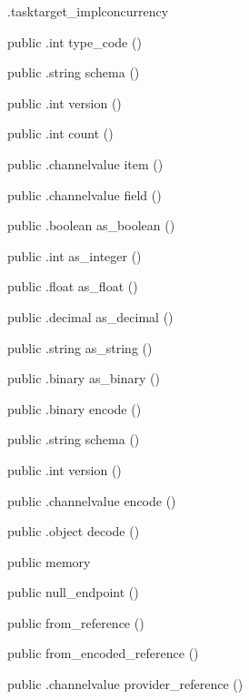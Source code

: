 \begin{CrexxClass}{.tasktarget\_impl}{concurrency}
\begin{Members}
    \Method
      {public}
      {.int}
      {type\_code}
      {()}

    \Method
      {public}
      {.string}
      {schema}
      {()}

    \Method
      {public}
      {.int}
      {version}
      {()}

    \Method
      {public}
      {.int}
      {count}
      {()}

    \Method
      {public}
      {.channelvalue}
      {item}
      {()}

    \Method
      {public}
      {.channelvalue}
      {field}
      {()}

    \Method
      {public}
      {.boolean}
      {as\_boolean}
      {()}

    \Method
      {public}
      {.int}
      {as\_integer}
      {()}

    \Method
      {public}
      {.float}
      {as\_float}
      {()}

    \Method
      {public}
      {.decimal}
      {as\_decimal}
      {()}

    \Method
      {public}
      {.string}
      {as\_string}
      {()}

    \Method
      {public}
      {.binary}
      {as\_binary}
      {()}

    \Method
      {public}
      {.binary}
      {encode}
      {()}

    \Method
      {public}
      {.string}
      {schema}
      {()}

    \Method
      {public}
      {.int}
      {version}
      {()}

    \Method
      {public}
      {.channelvalue}
      {encode}
      {()}

    \Method
      {public}
      {.object}
      {decode}
      {()}

    \Factory
      {public}
      {memory}
      {}

    \Factory
      {public}
      {null\_endpoint}
      {()}

    \Factory
      {public}
      {from\_reference}
      {()}

    \Factory
      {public}
      {from\_encoded\_reference}
      {()}

    \Method
      {public}
      {.channelvalue}
      {provider\_reference}
      {()}


\end{Members}
\end{CrexxClass}

